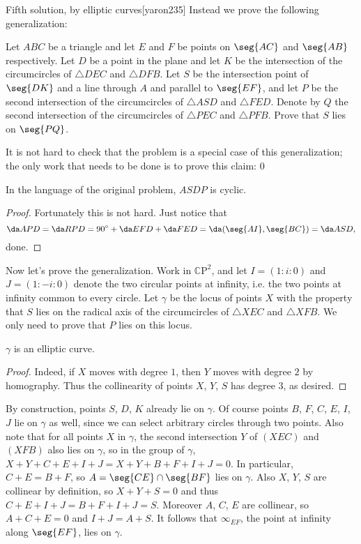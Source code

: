 \newpage
\begin{customenv}{Fifth solution, by elliptic curves}[yaron235]
    Instead we prove the following generalization:
    \begin{boxgprob}
        Let $ABC$ be a triangle and let $E$ and $F$ be points on $\seg{AC}$ and $\seg{AB}$ respectively. Let $D$ be a point in the plane and let $K$ be the intersection of the circumcircles of $\triangle DEC$ and $\triangle DFB$. Let $S$ be the intersection point of $\seg{DK}$ and a line through $A$ and parallel to $\seg{EF}$, and let $P$ be the second intersection of the circumcircles of $\triangle ASD$ and $\triangle FED$. Denote by $Q$ the second intersection of the circumcircles of $\triangle PEC$ and $\triangle PFB$. Prove that $S$ lies on $\seg{PQ}$.
    \end{boxgprob}
    It is not hard to check that the problem is a special case of this generalization; the only work that needs to be done is to prove this claim:
    \setcounter{iclaim}0
    \begin{iclaim}
        In the language of the original problem, $ASDP$ is cyclic.
    \end{iclaim}
    \begin{proof}
        Fortunately this is not hard. Just notice that \[\da APD=\da RPD=90^\circ+\da EFD+\da FED=\da(\seg{AI},\seg{BC})=\da ASD,\]
        done. 
    \end{proof}

    Now let's prove the generalization. Work in $\mathbb C\mathrm P^2$, and let $I=(1:i:0)$ and $J=(1:-i:0)$ denote the two circular points at infinity, i.e. the two points at infinity common to every circle. Let $\gamma$ be the locus of points $X$ with the property that $S$ lies on the radical axis of the circumcircles of $\triangle XEC$ and $\triangle XFB$. We only need to prove that $P$ lies on this locus.
    \begin{iclaim}
        $\gamma$ is an elliptic curve.
    \end{iclaim}
    \begin{proof}
        Indeed, if $X$ moves with degree $1$, then $Y$ moves with degree $2$ by homography. Thus the collinearity of points $X$, $Y$, $S$ has degree $3$, as desired.
    \end{proof}

    By construction, points $S$, $D$, $K$ already lie on $\gamma$. Of course points $B$, $F$, $C$, $E$, $I$, $J$ lie on $\gamma$ as well, since we can select arbitrary circles through two points. Also note that for all points $X$ in $\gamma$, the second intersection $Y$ of $(XEC)$ and $(XFB)$ also lies on $\gamma$, so in the group of $\gamma$, $X+Y+C+E+I+J=X+Y+B+F+I+J=0$. In particular, $C+E=B+F$, so $A=\seg{CE}\cap\seg{BF}$ lies on $\gamma$. Also $X$, $Y$, $S$ are collinear by definition, so $X+Y+S=0$ and thus $C+E+I+J=B+F+I+J=S$. Moreover $A$, $C$, $E$ are collinear, so $A+C+E=0$ and $I+J=A+S$. It follows that $\infty_{EF}$, the point at infinity along $\seg{EF}$, lies on $\gamma$.


\end{customenv}
